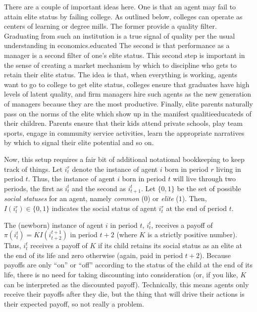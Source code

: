 \documentclass[
12pt,
titlepage,
reqno,
]{article}%
\begin{document}
	There are a couple of important ideas here.
	One is that an agent may fail to attain elite status by failing college.
	As outlined below, colleges can operate as centers of learning or degree mills.
	The former provide a quality filter.
	Graduating from such an institution is a true signal of quality per the usual understanding in economics.educated
	The second is that performance as a manager is a second filter of one's elite status.
	This second step is important in the sense of creating a market mechanism by which to discipline who gets to retain their elite status.
	The idea is that, when everything is working, agents want to go to college to get elite status, colleges ensure that graduates have high levels of latent quality, and firm managers hire such agents as the new generation of managers because they are the most productive.
	Finally,  elite parents naturally pass on the norms of the elite which show up in the manifest qualitieeducateds of their children.
	Parents ensure that their kids attend private schools, play team sports, engage in community service activities, learn the appropriate narratives by which to signal their elite potential and so on. 
	
	Now, this setup requires a fair bit of additional notational bookkeeping to keep track of things. 
	Let $i^r_t$ denote the instance of agent $i$ born in period $r$ living in period $t$.
	Thus, the instance of agent $i$ born in period $t$ will live through two periods, the first as $i^t_t$ and the second as $i^t_{t+1}$. 
	Let $\{0,1\}$ be the set of possible \textit{social statuses} for an agent, namely \textit{common} ($0$) or \textit{elite} ($1$). 
	Then, $I(i^r_t)\in\{0,1\}$ indicates the social status of agent $i^r_t$ at the end of period $t$. 
	
	The (newborn) instance of agent $i$ in period $t$, $i^t_t$, receives a payoff of $\pi(i^t_t)=KI(i^{t+1}_{t+2})$ in period $t+2$ (where $K$ is a strictly positive number).
	Thus, $i^t_t$ receives a payoff of $K$ if its child retains its social status as an elite at the end of its life and zero otherwise (again, paid in period $t+2$).
	Because payoffs are only ``on'' or ``off'' according to the status of the child at the end of its life, there is no need for taking discounting into consideration (or, if you like, $K$ can be interpreted as the discounted payoff).
	Technically, this means agents only receive their payoffs after they die, but the thing that will drive their actions is their expected payoff, so not really a problem.
	
\end{document}

